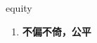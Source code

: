 
\begin{frame}
{\huge equity}
\begin{center}
\begin{enumerate}\Large
  \item \textbf{不偏不倚，公平}
\end{enumerate}
\end{center}
\end{frame}
